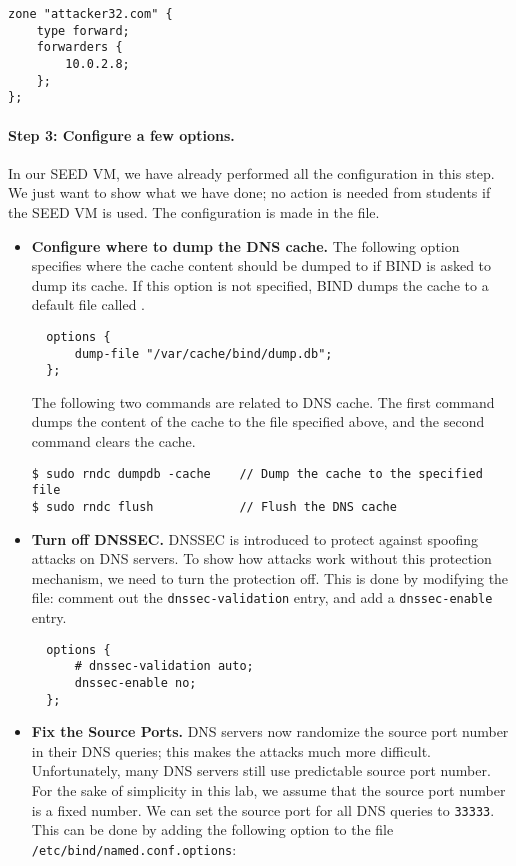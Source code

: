 \begin{lstlisting}
zone "attacker32.com" {
    type forward;
    forwarders {
        10.0.2.8;
    };
};
\end{lstlisting}
 


\paragraph{Step 3: Configure a few options.} 
In our SEED VM, we have already performed all the configuration
in this step. We just want to show what we have done; no action is
needed from students if the SEED VM is used. 
The configuration is made in the 
file.


\begin{itemize} 
\item 
\textbf{Configure where to dump the DNS cache.} 
The following option specifies where the cache content should be dumped to
if BIND is asked to dump its cache.  If this option is not specified, BIND
dumps the cache to a default file called
.

\begin{lstlisting}
  options {
      dump-file "/var/cache/bind/dump.db";
  };
\end{lstlisting}

The following two commands are related to DNS cache.
The first command dumps the content of the cache to the file specified above, and
the second command clears the cache.


\begin{lstlisting}
$ sudo rndc dumpdb -cache    // Dump the cache to the specified file
$ sudo rndc flush            // Flush the DNS cache
\end{lstlisting}


\item 
\textbf{Turn off DNSSEC.} 
DNSSEC is introduced to protect against spoofing attacks on DNS servers.
To show how attacks work
without this protection mechanism, we need to turn the protection off.
This is done by modifying the  file:
comment out the {\tt dnssec-validation} entry, and
add a {\tt dnssec-enable} entry.

\begin{lstlisting}
  options {
      # dnssec-validation auto;
      dnssec-enable no;
  };
\end{lstlisting}


\item 
\textbf{Fix the Source Ports.}
DNS servers now randomize
the source port number in their DNS queries; this makes the attacks much more
difficult. Unfortunately, many DNS servers still use predictable source
port number.  For the sake of simplicity in this lab, we assume that the
source port number is a fixed number. We can set the source port for all
DNS queries to {\tt 33333}. This can be done by adding the following option
to the file {\tt /etc/bind/named.conf.options}:


\end{itemize}

